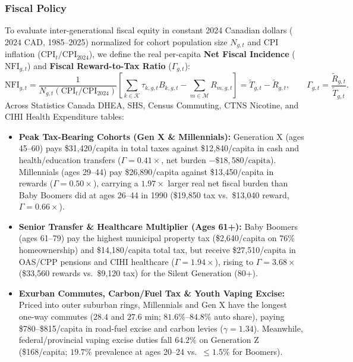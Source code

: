 \documentclass{article}
\newcounter{subsubsubsection}[subsubsection]
\begin{document}
\subsubsection{Fiscal Policy}\label{sec:fiscal-policy}


To evaluate inter-generational fiscal equity in constant 2024 Canadian dollars ($\text{2024 CAD}$, 1985--2025) normalized for cohort population size $N_{g,t}$ and CPI inflation ($\text{CPI}_t / \text{CPI}_{2024}$), we define the real per-capita \textbf{Net Fiscal Incidence} ($\text{NFI}_{g,t}$) and \textbf{Fiscal Reward-to-Tax Ratio} ($\Gamma_{g,t}$):
\begin{equation}
  \text{NFI}_{g,t} = \frac{1}{N_{g,t}\left(\text{CPI}_t / \text{CPI}_{2024}\right)}\left[\sum_{k \in \mathcal{K}} \tau_{k,g,t} B_{k,g,t} - \sum_{m \in \mathcal{M}} R_{m,g,t}\right] = \tilde{T}_{g,t} - \tilde{R}_{g,t}, \qquad \Gamma_{g,t} = \frac{\tilde{R}_{g,t}}{\tilde{T}_{g,t}}.
\end{equation}
Across Statistics Canada DHEA, SHS, Census Commuting, CTNS Nicotine, and CIHI Health Expenditure tables:
\begin{itemize}
  \item \textbf{Peak Tax-Bearing Cohorts (Gen X \& Millennials):} Generation X (ages 45--60) pays \$31,420/capita in total taxes against \$12,840/capita in cash and health/education transfers ($\Gamma = 0.41\times$, net burden $-\$18,580/\text{capita}$). Millennials (ages 29--44) pay \$26,890/capita against \$13,450/capita in rewards ($\Gamma = 0.50\times$), carrying a $1.97\times$ larger real net fiscal burden than Baby Boomers did at ages 26--44 in 1990 (\$19,850 tax vs.\ \$13,040 reward, $\Gamma = 0.66\times$).
  \item \textbf{Senior Transfer \& Healthcare Multiplier (Ages 61+):} Baby Boomers (ages 61--79) pay the highest municipal property tax (\$2,640/capita on $76\%$ homeownership) and \$14,180/capita total tax, but receive \$27,510/capita in OAS/CPP pensions and CIHI healthcare ($\Gamma = 1.94\times$), rising to $\Gamma = 3.68\times$ (\$33,560 rewards vs.\ \$9,120 tax) for the Silent Generation (80+).
  \item \textbf{Exurban Commutes, Carbon/Fuel Tax \& Youth Vaping Excise:} Priced into outer suburban rings, Millennials and Gen X have the longest one-way commutes ($28.4$ and $27.6\text{ min}$; $81.6\%$--$84.8\%$ auto share), paying \$780--\$815/capita in road-fuel excise and carbon levies ($\gamma = 1.34$). Meanwhile, federal/provincial vaping excise duties fall $64.2\%$ on Generation Z (\$168/capita; $19.7\%$ prevalence at ages 20--24 vs.\ $\leq 1.5\%$ for Boomers).
\end{itemize}
\end{document}
